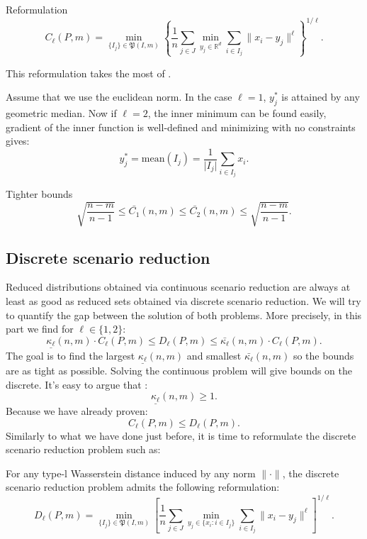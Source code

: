 \documentclass{amsart}
\begin{document}
\begin{theorem}{Reformulation}\label{theorem1}
$$C_\ell(P,m)=\min_{\{I_j\}\in \mathfrak{P}(I,m)}\left\{ \frac{1}{n}\sum_{j\in J}\min_{y_j\in\mathbb{R}^d}\sum_{i\in I_j}\lVert x_i-y_j\rVert^\ell \right\}^{1/\ell}.$$
\end{theorem}
\begin{remark}
    This reformulation takes the most of .
\end{remark}
Assume that we use the euclidean norm. In the case $\ell=1$, $y_j^*$ is attained by any geometric median. Now if $\ell=2$, the inner minimum can be found easily, gradient of the inner function is well-defined and minimizing with  no constraints gives: $$y_j^*=\text{mean}\left(I_j\right)=\frac{1}{\lvert I_j\rvert}{\sum_{i\in I_j}x_i}.$$ 
\begin{theorem}{Tighter bounds}
    $$\sqrt{\frac{n-m}{n-1}}\leq\bar{C_1}\left(n,m\right)\leq\bar{C_2}\left(n,m\right)\leq\sqrt{\frac{n-m}{n-1}}.$$
\end{theorem}
\subsection{Discrete scenario reduction}
Reduced distributions obtained via continuous scenario reduction are always at least as good as reduced sets obtained via discrete scenario reduction. We will try to quantify the gap between the solution of both problems. More precisely, in this part we find for $\ell\in\{1,2\}$: 
$$\underline{\kappa_\ell}\left(n,m\right)\cdot C_\ell\left(P,m\right)\leq D_\ell\left(P,m\right)\leq \bar{\kappa_\ell}\left(n,m\right)\cdot C_\ell\left(P,m\right).$$
The goal is to find the largest $\underline{\kappa_\ell}\left(n,m\right)$ and smallest $\bar{\kappa_\ell}\left(n,m\right)$ so the bounds are as tight as possible. Solving the continuous problem will give bounds on the discrete. It's easy to argue that : 
$$
\underline{\kappa_\ell}\left(n,m\right)\geq1.
$$
Because we have already proven: 
$$
C_\ell\left(P,m\right)\leq D_\ell\left(P,m\right).
$$
Similarly to what we have done just before, it is time to reformulate the discrete scenario reduction problem such as:
\begin{theorem}\label{reformulation 2}
    For any type-l Wasserstein distance induced by any norm $\lVert\cdot\rVert$, the discrete scenario reduction problem admits the following reformulation: 
    $$
    D_\ell\left(P,m\right)=\min_{\{I_j\}\in\mathfrak{P}\left(I,m\right)}\left[ \frac{1}{n}\sum_{j\in J}\min_{y_j\in\{x_i : i\in I_j\}}\sum_{i\in I_j}\lVert x_i-y_j\rVert^\ell\right]^{1/\ell}.
    $$
\end{theorem}
\end{document}
